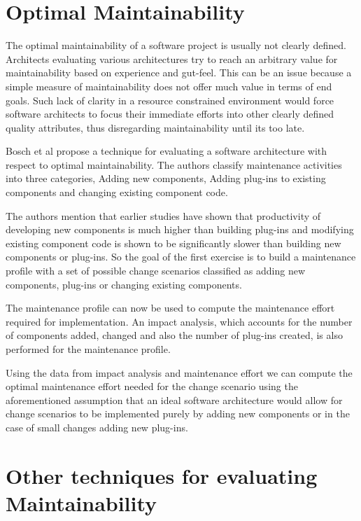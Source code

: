 \documentclass[15pt]{article}
\begin{document}
\section{Optimal Maintainability}

The optimal maintainability of a software project is usually not clearly defined. Architects evaluating various architectures try to reach an arbitrary value for maintainability based on experience and gut-feel. This can be an issue because a simple measure of maintainability does not offer much value in terms of end goals. Such lack of clarity in a resource constrained environment would force software architects to focus their immediate efforts into other clearly defined quality attributes, thus disregarding maintainability until its too late.

Bosch et al \cite{bosch_assessing_2001} propose a technique for evaluating a software architecture with respect to optimal maintainability. The authors classify maintenance activities into three categories, Adding new components, Adding plug-ins to existing components and changing existing component code.

The authors mention that earlier studies \cite{henry_quantitative_1997} \cite{maxwell_software_1996} have shown that productivity of developing new components is much higher than building plug-ins and modifying existing component code is shown to be significantly slower than building new components or plug-ins. So the goal of the first exercise is to build a maintenance profile with a set of possible change scenarios classified as adding new components, plug-ins or changing existing components. 

The maintenance profile can now be used to compute the maintenance effort required for implementation. An impact analysis, which accounts for the number of components added, changed and also the number of plug-ins created, is also performed for the maintenance profile. 

Using the data from impact analysis and maintenance effort we can compute the optimal maintenance effort needed for the change scenario using the aforementioned assumption that an ideal software architecture would allow for change scenarios to be implemented purely by adding new components or in the case of small changes adding new plug-ins. 


\section{Other techniques for evaluating Maintainability}
\end{document}

